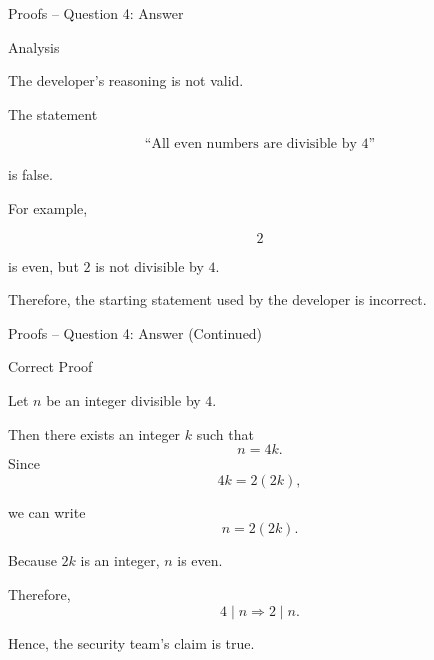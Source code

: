 
\begin{frame}{Proofs -- Question 4: Answer}

\begin{exampleblock}{Analysis}

The developer's reasoning is not valid.

The statement

\[
\text{``All even numbers are divisible by }4\text{''}
\]

is false.

For example,

\[
2
\]

is even, but $2$ is not divisible by $4$.

Therefore, the starting statement used by the developer is incorrect.

\end{exampleblock}

\end{frame}


\begin{frame}{Proofs -- Question 4: Answer (Continued)}
\vspace{-0.5cm}
\begin{exampleblock}{Correct Proof}

Let $n$ be an integer divisible by $4$.

Then there exists an integer $k$ such that
\[
n=4k.
\]
Since
\[
4k=2(2k),
\]

we can write
\[
n=2(2k).
\]

Because $2k$ is an integer, $n$ is even.

Therefore,
\[
\boxed{4\mid n\Rightarrow 2\mid n}.
\]

Hence, the security team's claim is true.

\end{exampleblock}

\end{frame}


